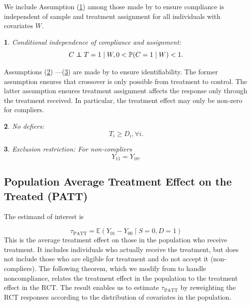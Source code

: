 \documentclass[12pt]{article}
\makeatletter
\newtheorem*{assumption*}{\assumptionnumber}
\providecommand{\assumptionnumber}{}
\newenvironment{assumption}[2]
 {%
  \renewcommand{\assumptionnumber}{Assumption #1}%
  \begin{assumption*}%
  \protected@edef\@currentlabel{#1}%
 }
 {%
  \end{assumption*}
 }
\newcommand{\pr}{\mathbb{P}} %
\newcommand{\ex}{\mathbb{E}} %
\newcommand\independent{\protect\mathpalette{\protect\independenT}{\perp}}
\def\independenT#1#2{\mathrel{\rlap{$#1#2$}\mkern2mu{#1#2}}}
\makeatother
\begin{document}
\noindent We include Assumption (\ref{compl}) among those made by \cite{Hartman} to ensure compliance is independent of sample and treatment assignment for all individuals with covariates $W$. 
 
\begin{assumption}{5}{}\label{compl}
Conditional independence of compliance and assignment:
\begin{equation*}
C \independent T=1 \mid W, 0 < \pr(C = 1 \mid W) < 1. 
\end{equation*}
\end{assumption}

Assumptions (\ref{monotonicity}) ---(\ref{ER}) are made by \cite{Angrist1996} to ensure identifiability. The former assumption ensures that crossover is only possible from treatment to control.  The latter assumption ensures treatment assignment affects the response only through the treatment received.  In particular, the treatment effect may only be non-zero for compliers.

\begin{assumption}{6}{}\label{monotonicity}
No defiers: 
\begin{equation*}
T_i \geq D_i, \forall i. 
\end{equation*}
\end{assumption}

\begin{assumption}{7}{}\label{ER}
Exclusion restriction: For non-compliers
\begin{equation*}
Y_{11} = Y_{10}. 
\end{equation*}  
\end{assumption}


\subsection{Population Average Treatment Effect on the Treated (PATT)}
The estimand of interest is 

\begin{equation}
\tau_{\text{PATT}} = \ex\left( Y_{01} - Y_{00} \mid S=0, D=1\right)
\end{equation}
This is the average treatment effect on those in the population who receive treatment.  It includes individuals who actually receive the treatment, but does not include those who are eligible for treatment and do not accept it (non-compliers).  The following theorem, which we modify from \cite{Hartman} to handle noncompliance, relates the treatment effect in the population to the treatment effect in the RCT. The result enables us to estimate $\tau_{\text{PATT}}$ by reweighting the RCT responses according to the distribution of covariates in the population. 
\end{document}

